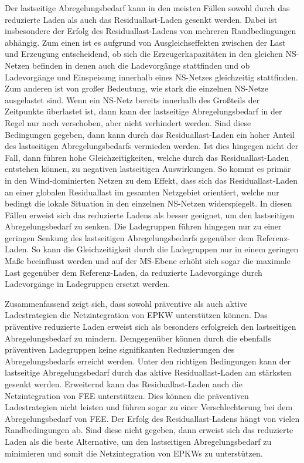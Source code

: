 Der lastseitige Abregelungsbedarf kann in den meisten Fällen sowohl durch das reduzierte Laden als auch das Residuallast-Laden gesenkt werden.
Dabei ist insbesondere der Erfolg des Residuallast-Ladens von mehreren Randbedingungen abhängig.
Zum einen ist es aufgrund von Ausgleichseffekten zwischen der Last und Erzeugung entscheidend, ob sich die Erzeugerkapazitäten in den gleichen \gls{NS}-Netzen befinden in denen auch die Ladevorgänge stattfinden und ob Ladevorgänge und Einspeisung innerhalb eines \gls{NS}-Netzes gleichzeitig stattfinden.
Zum anderen ist von großer Bedeutung, wie stark die einzelnen \gls{NS}-Netze ausgelastet sind.
Wenn ein \gls{NS}-Netz bereits innerhalb des Großteils der Zeitpunkte überlastet ist, dann kann der lastseitige Abregelungsbedarf in der Regel nur noch verschoben, aber nicht verhindert werden.
Sind diese Bedingungen gegeben, dann kann durch das Residuallast-Laden ein hoher Anteil des lastseitigen Abregelungsbedarfs vermieden werden.
Ist dies hingegen nicht der Fall, dann führen hohe Gleichzeitigkeiten, welche durch das Residuallast-Laden entstehen können, zu negativen lastseitigen Auswirkungen.
So kommt es primär in den Wind-dominierten Netzen zu dem Effekt, dass sich das Residuallast-Laden an einer globalen Residuallast im gesamten Netzgebiet orientiert, welche nur bedingt die lokale Situation in den einzelnen \gls{NS}-Netzen widerspiegelt.
In diesen Fällen erweist sich das reduzierte Ladens als besser geeignet, um den lastseitigen Abregelungsbedarf zu senken.
Die Ladegruppen führen hingegen nur zu einer geringen Senkung des lastseitigen Abregelungsbedarfs gegenüber dem Referenz-Laden.
So kann die Gleichzeitigkeit durch die Ladegruppen nur in einem geringen Maße beeinflusst werden und auf der \gls{MS}-Ebene erhöht sich sogar die maximale Last gegenüber dem Referenz-Laden, da reduzierte Ladevorgänge durch Ladevorgänge in Ladegruppen ersetzt werden.\medskip

Zusammenfassend zeigt sich, dass sowohl präventive als auch aktive Ladestrategien die Netzintegration von \gls{EPKW} unterstützen können.
Das präventive reduzierte Laden erweist sich als besonders erfolgreich den lastseitigen Abregelungsbedarf zu mindern.
Demgegenüber können durch die ebenfalls präventiven Ladegruppen keine signifikanten Reduzierungen des Abregelungsbedarfs erreicht werden.
Unter den richtigen Bedingungen kann der lastseitige Abregelungsbedarf durch das aktive Residuallast-Laden am stärksten gesenkt werden.
Erweiternd kann das Residuallast-Laden auch die Netzintegration von \gls{FEE} unterstützen.
Dies können die präventiven Ladestrategien nicht leisten und führen sogar zu einer Verschlechterung bei dem Abregelungsbedarf von \gls{FEE}.
Der Erfolg des Residuallast-Ladens hängt von vielen Randbedingungen ab.
Sind diese nicht gegeben, dann erweist sich das reduzierte Laden als die beste Alternative, um den lastseitigen Abregelungsbedarf zu minimieren und somit die Netzintegration von \glspl{EPKW} zu unterstützen.\medskip

